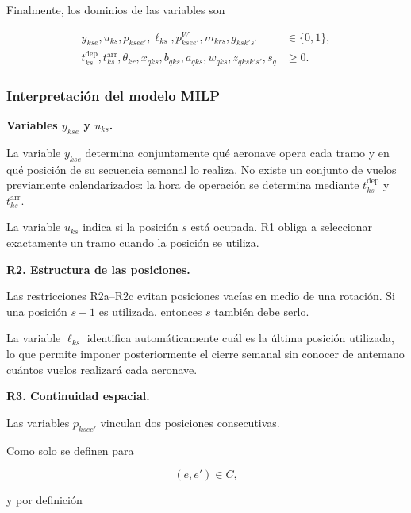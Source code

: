 Finalmente, los dominios de las variables son

\begin{align}
y_{kse},u_{ks},p_{ksee'},\ell_{ks},p^W_{ksee'},
m_{krs},g_{ksk's'}
&\in
\{0,1\},
\tag{R14a}
\label{eq:r14a}
\\
t_{ks}^{\mathrm{dep}},t_{ks}^{\mathrm{arr}},
\theta_{kr},
x_{qks},b_{qks},a_{qks},w_{qks},
z_{qksk's'},s_q
&\geq
0.
\tag{R14b}
\label{eq:r14b}
\end{align}


\subsubsection{Interpretación del modelo MILP}
\label{app:interpretacion_milp}

\vspace{0.5em}
\noindent\textbf{Variables $y_{kse}$ y $u_{ks}$.}

La variable $y_{kse}$ determina conjuntamente qué aeronave opera cada tramo y en qué posición
de su secuencia semanal lo realiza. No existe un conjunto de vuelos previamente calendarizados:
la hora de operación se determina mediante $t_{ks}^{\mathrm{dep}}$ y
$t_{ks}^{\mathrm{arr}}$.

La variable $u_{ks}$ indica si la posición $s$ está ocupada. R1 obliga a seleccionar
exactamente un tramo cuando la posición se utiliza.


\vspace{0.5em}
\noindent\textbf{R2. Estructura de las posiciones.}

Las restricciones R2a--R2c evitan posiciones vacías en medio de una rotación. Si una posición
$s+1$ es utilizada, entonces $s$ también debe serlo.

La variable $\ell_{ks}$ identifica automáticamente cuál es la última posición utilizada, lo
que permite imponer posteriormente el cierre semanal sin conocer de antemano cuántos vuelos
realizará cada aeronave.


\vspace{0.5em}
\noindent\textbf{R3. Continuidad espacial.}

Las variables $p_{ksee'}$ vinculan dos posiciones consecutivas.

Como solo se definen para

\[
(e,e')\in C,
\]

y por definición

